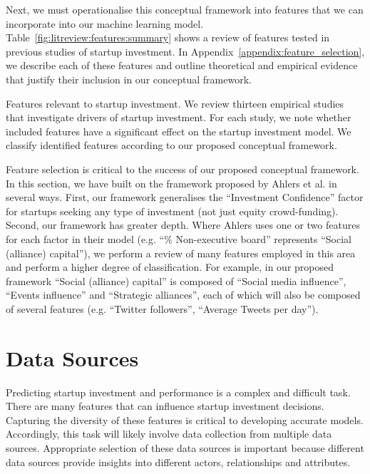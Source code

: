\documentclass[../thesis/thesis.tex]{subfiles}
\begin{document}
Next, we must operationalise this conceptual framework into features that we can incorporate into our machine learning model. Table~\ref{fig:litreview:features:summary} shows a review of features tested in previous studies of startup investment. In Appendix~\ref{appendix:feature_selection}, we describe each of these features and outline theoretical and empirical evidence that justify their inclusion in our conceptual framework.

\begin{table}[!htb]
    \centering
    \scalebox{1}{
        
    }
    \caption[Features relevant to startup investment]{Features relevant to startup investment. We review thirteen empirical studies that investigate drivers of startup investment. For each study, we note whether included features have a significant effect on the startup investment model. We classify identified features according to our proposed conceptual framework.}
    \label{fig:litreview:features:summary}
\end{table}

Feature selection is critical to the success of our proposed conceptual framework. In this section, we have built on the framework proposed by Ahlers et al. \cite{ahlers2015} in several ways. First, our framework generalises the ``Investment Confidence'' factor for startups seeking any type of investment (not just equity crowd-funding). Second, our framework has greater depth. Where Ahlers uses one or two features for each factor in their model (e.g. ``\% Non-executive board'' represents ``Social (alliance) capital''), we perform a review of many features employed in this area and perform a higher degree of classification. For example, in our proposed framework ``Social (alliance) capital'' is composed of ``Social media influence'', ``Events influence'' and ``Strategic alliances'', each of which will also be composed of several features (e.g. ``Twitter followers'', ``Average Tweets per day'').

\section{Data Sources}

Predicting startup investment and performance is a complex and difficult task. There are many features that can influence startup investment decisions. Capturing the diversity of these features is critical to developing accurate models. Accordingly, this task will likely involve data collection from multiple data sources. Appropriate selection of these data sources is important because different data sources provide insights into different actors, relationships and attributes.
\end{document}
